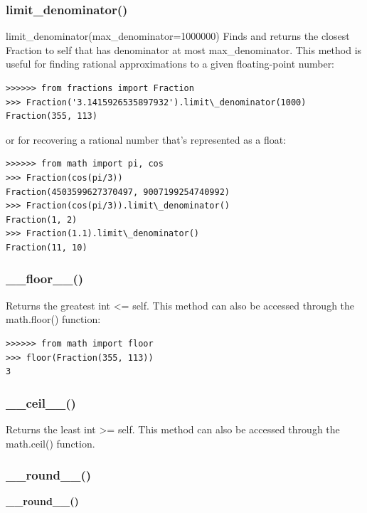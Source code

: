 \subsubsection{limit\_denominator()}

limit\_denominator(max\_denominator=1000000)
Finds and returns the closest Fraction to self that has denominator at most max\_denominator. This method is useful for finding rational approximations to a given floating-point number:

\begin{lstlisting}
>>>>>> from fractions import Fraction
>>> Fraction('3.1415926535897932').limit\_denominator(1000)
Fraction(355, 113)
\end{lstlisting}

or for recovering a rational number that’s represented as a float:

\begin{lstlisting}
>>>>>> from math import pi, cos
>>> Fraction(cos(pi/3))
Fraction(4503599627370497, 9007199254740992)
>>> Fraction(cos(pi/3)).limit\_denominator()
Fraction(1, 2)
>>> Fraction(1.1).limit\_denominator()
Fraction(11, 10)
\end{lstlisting}

\subsubsection{\_\_floor\_\_()}

Returns the greatest int <= self. This method can also be accessed through the math.floor() function:

\begin{lstlisting}
>>>>>> from math import floor
>>> floor(Fraction(355, 113))
3
\end{lstlisting}

\subsubsection{\_\_ceil\_\_()}

Returns the least int >= self. This method can also be accessed through the math.ceil() function.

\subsubsection{\_\_round\_\_()}

\textbf{\_\_round\_\_()}

